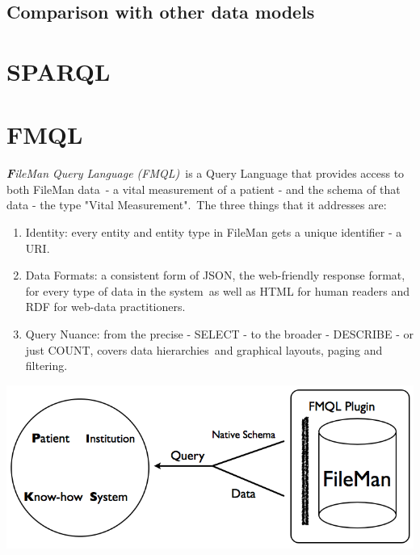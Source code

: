 \documentclass[DIV=calc, paper=a4, fontsize=12pt, onecolumn]{scrartcl}	 %
\newcommand{\initial}[1]{ %
\lettrine[lines=3,lhang=0.3,nindent=0em,slope=0em]{
\color{DarkBlue}
{\textbf{\textit{#1}}}}{}}
\begin{document}
\subsection{Comparison with other data models}

\section[SPARQL Protocol and RDF Query Language (SPARQL)]{SPARQL}

 \section[FileMan Query Language (FMQL)]{FMQL}

\initial{F}\textit{ileMan Query Language (FMQL)}\
is a Query Language that provides access to both FileMan data\
- a vital measurement of a patient - and the schema of that data - the type "Vital Measurement".\
The three things that it addresses are:
\begin{enumerate}
\item
Identity: every entity and entity type in FileMan gets a unique identifier - a URI.
\item
Data Formats: a consistent form of JSON, the web-friendly response format, for every type of data in the system\
 as well as HTML for human readers and RDF for web-data practitioners.
\item
Query Nuance: from the precise - SELECT - to the broader - DESCRIBE - or just COUNT, covers data hierarchies\
 and graphical layouts, paging and filtering.
\end{enumerate}
\includegraphics[scale=0.4]{fmqlFromFileMan.png}



  
  {}

\end{document}
